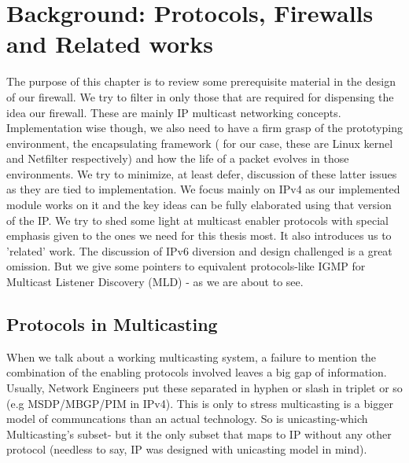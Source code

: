 \documentclass[11pt,left=2cm,bottom=2cm,oneside]{book}
\begin{document}
\chapter{Background: Protocols, Firewalls and Related
works}
The purpose of this chapter is to review some prerequisite material in the
design
of our firewall. We try to filter in only those that are required for
dispensing the idea
our firewall. These are mainly IP multicast networking concepts.
Implementation
wise though, we also need to have a firm grasp of the prototyping environment,
the encapsulating framework ( for our case, these are Linux kernel and
Netfilter
respectively) and how the life of a packet evolves in those environments. We
try
to minimize, at least defer, discussion of these latter issues as they are
tied to
implementation. We focus mainly on IPv4 as our implemented module works on it
and the key ideas can be fully elaborated using that version of the IP. We try
to shed
some light at multicast enabler protocols with special emphasis given to the
ones we
need for this thesis most. It also introduces us to 'related' work. The
discussion of
IPv6 diversion and design challenged is a great omission. But we give some
pointers
to equivalent protocols-like IGMP for Multicast Listener Discovery (MLD) - as
we
are about to see.
\section{Protocols in Multicasting}
When we talk about a working multicasting system, a failure to mention the
combination of the enabling protocols involved leaves a big gap of
information.
Usually, Network Engineers put these separated in hyphen or slash in triplet
or
so (e.g MSDP/MBGP/PIM in IPv4). This is only to stress multicasting is a bigger model of communcations than an actual technology. So is unicasting-which Multicasting's subset- but it the only subset that maps to IP
without
any other protocol (needless to say, IP was designed with unicasting model in
mind).
\end{document}

